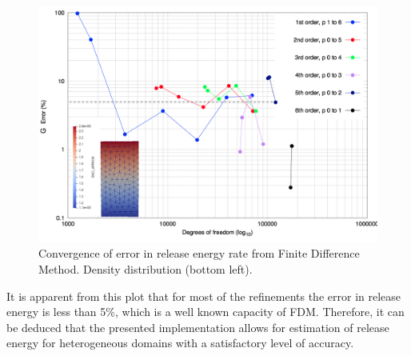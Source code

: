 \documentclass[11pt]{acmeArticle}
\numberwithin{equation}{section}
\begin{document}
\begin{figure}
	\centering
	\includegraphics[width=0.7\linewidth]{Figures/graphs/covergence_FDM.png}
	\caption{Convergence of error in release energy rate from Finite Difference Method. Density distribution (bottom left).}
	\label{fig:covergencefdm}
\end{figure}
It is apparent from this plot that for most of the refinements the error in release energy is less than 5\%, which is a well known capacity of FDM.  %
Therefore, it can be deduced that the presented implementation allows for estimation of release energy for heterogeneous domains with a satisfactory level of accuracy.
\end{document}
